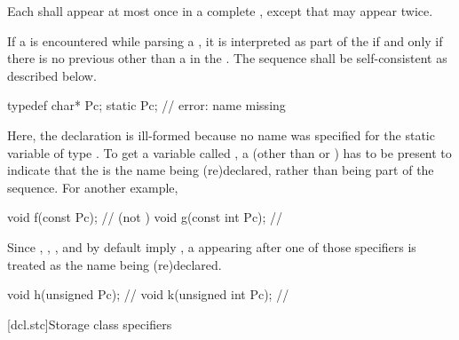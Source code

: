 \pnum
Each  shall appear at most once in a complete
, except that
 may appear twice.

\pnum
{}%
If a  is encountered while parsing a ,
it is interpreted as part of the  if and only if there is no
previous  other than a  in the
.
The sequence shall be self-consistent as
described below.
\enterexample

\begin{codeblock}
typedef char* Pc;
static Pc;                      // error: name missing
\end{codeblock}

Here, the declaration   is ill-formed because no
name was specified for the static variable of type . To get a
variable called , a  (other than
 or ) has to be present to indicate that
the   is the name being (re)declared,
rather than being part of the  sequence. For
another example,

\begin{codeblock}
void f(const Pc);               //  (not )
void g(const int Pc);           // 
\end{codeblock}
\exitexample

\pnum
{}%
%
%
%
\enternote
Since , , , and 
by default imply , a  appearing after one
of those specifiers is treated as the name being (re)declared.
\enterexample

\begin{codeblock}
void h(unsigned Pc);            // 
void k(unsigned int Pc);        // 
\end{codeblock}
\exitexample
\exitnote

[dcl.stc]{Storage class specifiers}%
%
%
%
%
%


